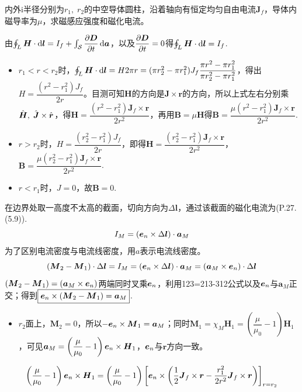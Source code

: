 \documentclass{mynote}
\begin{document}
\begin{exercise}{1.8}
    内外i半径分别为$r_1,\; r_2$的中空导体圆柱，沿着轴向有恒定均匀自由电流$\bm{J}_f$，导体内磁导率为$\mu$，求磁感应强度和磁化电流。
\end{exercise}
\begin{solution}
    由$\oint_{L} \boldsymbol{H} \cdot \mathop{}\!\mathrm{d} \boldsymbol{l} = I_f + \int_{\mathcal{S}} \dfrac{\partial \boldsymbol{D}}{\partial t} \mathop{}\!\mathrm{d} \boldsymbol{a}$，以及$\dfrac{\partial \boldsymbol{D}}{\partial t} = 0$得$\oint_{L} \boldsymbol{H} \cdot \mathop{}\!\mathrm{d} \boldsymbol{l} = I_f$.
    \begin{itemize}
        \item $r_1 < r < r_2$时，$\oint_{L} \boldsymbol{H} \cdot \mathop{}\!\mathrm{d} \boldsymbol{l} = H 2 \pi r = (\pi r_2^2 - \pi r_1^2) J_f \dfrac{\pi r^2 - \pi r_1^2}{\pi r_2^2 - \pi r_1^2}$，得出$H = \dfrac{(r^2 - r_1^2) J_f}{2r}$。目测可知$\bm{H}$的方向是$\bm{J} \times \bm{r}$的方向，所以上式左右分别乘$\hat{\boldsymbol{H}},\;\hat{\boldsymbol{J}} \times \hat{\boldsymbol{r}}$，得$\bm{H} = \dfrac{(r^2 - r_1^2) \bm{J}_f \times \bm{r}}{2r^2}$，再用$\bm{B} = \mu \bm{H}$得$\bm{B} = \dfrac{\mu (r^2 - r_1^2) \bm{J}_f \times \bm{r}}{2r^2}$.
        \item $r > r_2$时，$H = \dfrac{(r_2^2 - r_1^2) J_f}{2r}$，即得$\bm{H} = \dfrac{(r_2^2 - r_1^2) \bm{J}_f \times \bm{r}}{2r^2}$，$\bm{B} = \dfrac{\mu (r_2^2 - r_1^2) \bm{J}_f \times \bm{r}}{2r^2}$.
        \item $r <r_1$时，$J = 0$，故$\bm{B} = 0$.
    \end{itemize}
    在边界处取一高度不太高的截面，切向方向为$\Delta \bm{l}$，通过该截面的磁化电流为(P.27.(5.9)).
    \[
    I_M = (\boldsymbol{e}_n \times \Delta \boldsymbol{l}) \cdot \boldsymbol{a}_M    
    \]
    为了区别电流密度与电流线密度，用$a$表示电流线密度。
    \[
        (\boldsymbol{M}_2 - \boldsymbol{M}_1) \cdot \Delta \boldsymbol{l} = I_M = (\boldsymbol{e}_n \times \Delta \boldsymbol{l}) \cdot \boldsymbol{a}_M = (\boldsymbol{a}_M \times \boldsymbol{e}_n)\cdot \Delta \boldsymbol{l}
    \]
    $ (\boldsymbol{M}_2 - \boldsymbol{M}_1) = (\boldsymbol{a}_M \times \boldsymbol{e}_n)$两端同时叉乘$\boldsymbol{e}_n$，利用123=213-312公式以及$\boldsymbol{e}_n$与$\bm{a}_M$正交；得到$\boxed{\boldsymbol{e}_n \times (\boldsymbol{M}_2 - \boldsymbol{M}_1) = \boldsymbol{a}_M}$.
    \begin{itemize}
        \item $r_2$面上，$\bm{M}_2 = 0$，所以$- \boldsymbol{e}_n \times \boldsymbol{M}_1 = \boldsymbol{a}_M$；同时$\bm{M}_1 = \chi_M \bm{H}_1 = \left( \dfrac{\mu}{\mu_0} - 1\right) \bm{H}_1 $，可见$\boldsymbol{a}_M = \left( \dfrac{\mu}{\mu_0} - 1\right) \boldsymbol{e}_n \times \boldsymbol{H}_1$，$\boldsymbol{e}_n$与$\bm{r}$方向一致。
    \end{itemize}
    \begin{align*}
        \left( \dfrac{\mu}{\mu_0} - 1\right) \e_n \times \bm{H}_1 &= \left( \dfrac{\mu}{\mu_0} - 1\right) \left[ \e_n \times \left( \frac{1}{2} \bm{J}_f \times \bm{r} - \frac{r_1^2}{2r^2} \bm{J}_f \times \bm{r} \right) \right]_{r=r_2} \\

\end{align*}
\end{solution}
\end{document}
